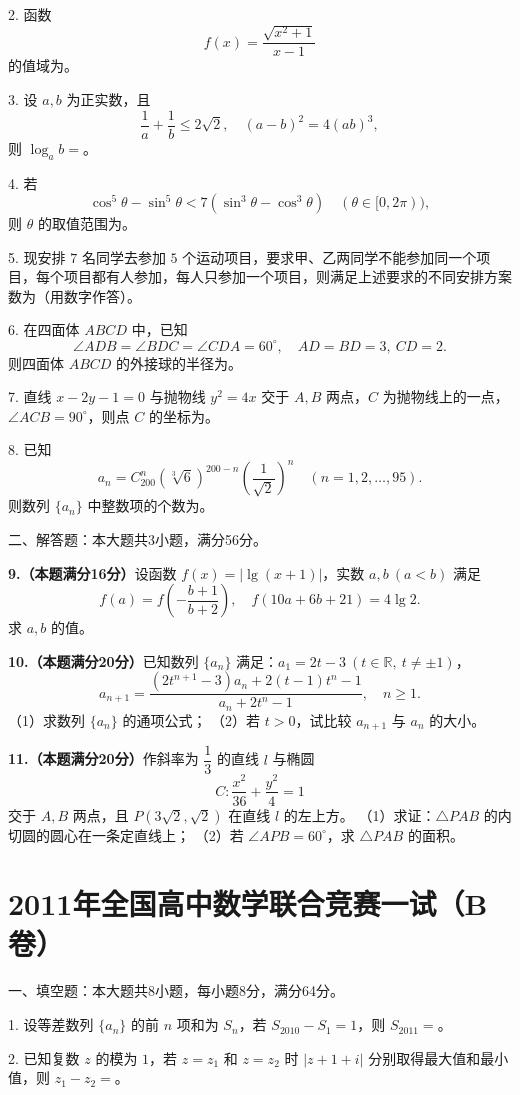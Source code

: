 \documentclass[11pt]{ctexart}
\begin{document}
2. 函数
$$
f(x)=\frac{\sqrt{x^2+1}}{x-1}
$$
的值域为\blank{}。

3. 设 $a,b$ 为正实数，且
$$
\frac1a+\frac1b\le2\sqrt2,\quad (a-b)^2=4(ab)^3,
$$
则 $\log_a b=$\blank{}。

4. 若
$$
\cos^5\theta-\sin^5\theta<7(\sin^3\theta-\cos^3\theta)\quad(\theta\in[0,2\pi)),
$$
则 $\theta$ 的取值范围为\blank{}。

5. 现安排 $7$ 名同学去参加 $5$ 个运动项目，要求甲、乙两同学不能参加同一个项目，每个项目都有人参加，每人只参加一个项目，则满足上述要求的不同安排方案数为\blank{}（用数字作答）。

6. 在四面体 $ABCD$ 中，已知
$$
\angle ADB=\angle BDC=\angle CDA=60^\circ,\quad AD=BD=3,\ CD=2.
$$
则四面体 $ABCD$ 的外接球的半径为\blank{}。

7. 直线 $x-2y-1=0$ 与抛物线 $y^2=4x$ 交于 $A,B$ 两点，$C$ 为抛物线上的一点，$\angle ACB=90^\circ$，则点 $C$ 的坐标为\blank{}。

8. 已知
$$
a_n=C_{200}^n(\sqrt[3]{6})^{200-n}\left(\frac1{\sqrt2}\right)^n\quad(n=1,2,\dots,95).
$$
则数列 $\{a_n\}$ 中整数项的个数为\blank{}。

二、解答题：本大题共3小题，满分56分。


\clearpage
\textbf{9.（本题满分16分）}设函数 $f(x)=|\lg(x+1)|$，实数 $a,b\ (a<b)$ 满足
$$
f(a)=f\left(-\frac{b+1}{b+2}\right),\quad f(10a+6b+21)=4\lg2.
$$
求 $a,b$ 的值。

\clearpage
\textbf{10.（本题满分20分）}已知数列 $\{a_n\}$ 满足：$a_1=2t-3\ (t\in\mathbb R,\ t\ne\pm1)$，
$$
a_{n+1}=\frac{(2t^{n+1}-3)a_n+2(t-1)t^n-1}{a_n+2t^n-1},\quad n\ge1.
$$
（1）求数列 $\{a_n\}$ 的通项公式；  
（2）若 $t>0$，试比较 $a_{n+1}$ 与 $a_n$ 的大小。

\clearpage
\textbf{11.（本题满分20分）}作斜率为 $\dfrac13$ 的直线 $l$ 与椭圆
$$
C:\frac{x^2}{36}+\frac{y^2}{4}=1
$$
交于 $A,B$ 两点，且 $P(3\sqrt2,\sqrt2)$ 在直线 $l$ 的左上方。  
（1）求证：$\triangle PAB$ 的内切圆的圆心在一条定直线上；  
（2）若 $\angle APB=60^\circ$，求 $\triangle PAB$ 的面积。

\clearpage
\section*{2011年全国高中数学联合竞赛一试（B卷）}

一、填空题：本大题共8小题，每小题8分，满分64分。

1. 设等差数列 $\{a_n\}$ 的前 $n$ 项和为 $S_n$，若 $S_{2010}-S_1=1$，则 $S_{2011}=$\blank{}。

2. 已知复数 $z$ 的模为 $1$，若 $z=z_1$ 和 $z=z_2$ 时 $|z+1+i|$ 分别取得最大值和最小值，则 $z_1-z_2=$\blank{}。
\end{document}
